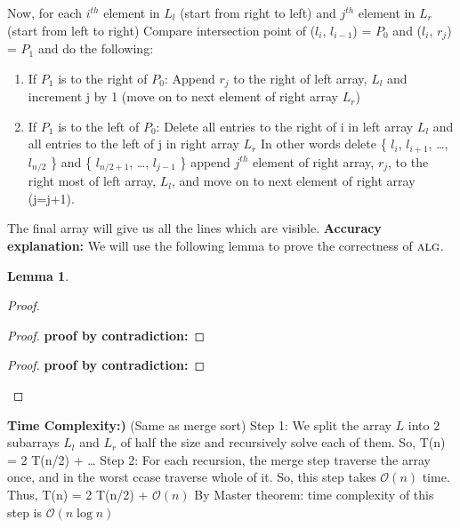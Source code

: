 \documentclass[11pt]{article}
\renewcommand{\O}{\mathcal{O}}
\newcommand{\alg}{\textsc{alg}}
\newtheorem{lemma}[theorem]{Lemma}
\begin{document}
Now, for each $i^{th}$ element in $L_l$ (start from right to left) and $j^{th}$ element in $L_r$ (start from left to right) \newline
Compare intersection point of ($l_i$, $l_{i-1}$) = $P_0$ and  ($l_i$, $r_j$) = $P_1$ and do the following: \newline
\begin{enumerate}
\item If $P_1$ is to the right of $P_0$: \newline
Append $r_j$ to the right of left array, $L_l$ and increment j by 1 (move on to next element of right array $L_r$) \newline
\item If $P_1$ is to the left of $P_0$: \newline
Delete all entries to the right of i in left array $L_l$ and all entries to the left of j in right array $L_r$ \newline
In other words delete \{ $l_i$, $l_{i+1}$, \dots , $l_{n/2}$ \} and \{ $l_{n/2+1}$, \dots, $l_{j-1}$ \} \newline
append $j^{th}$ element of right array, $r_j$, to the right most of left array, $L_l$, and move on to next
element of right array (j=j+1). \newline
\end{enumerate}
The final array will give us all the lines which are visible.   \newline
{\bf Accuracy explanation:}\newline
We will use the following lemma to prove the correctness of $\alg$.

\begin{lemma}\label{visible-lines-lemma}
\end{lemma}

\begin{proof}

\begin{proof}
{\bf proof by contradiction:} 
\end{proof}
\begin{proof}
{\bf proof by contradiction:} 
\end{proof}
\end{proof}

{\bf Time Complexity:)} (Same as merge sort) \newline
Step 1: We split the array $L$ into 2 subarrays $L_l$ and $L_r$ of half the size and recursively solve each of them. 
So, T(n) = 2 T(n/2) + \dots \newline
Step 2: For each recursion, the merge step traverse the array once, and in the worst ccase traverse whole of it. \newline
So, this step takes $\O(n)$ time. \newline
Thus, T(n) = 2 T(n/2) + $\O(n)$ \newline
By Master theorem: time complexity of this step is $\O(n\log n)$ \newline
\end{document}
